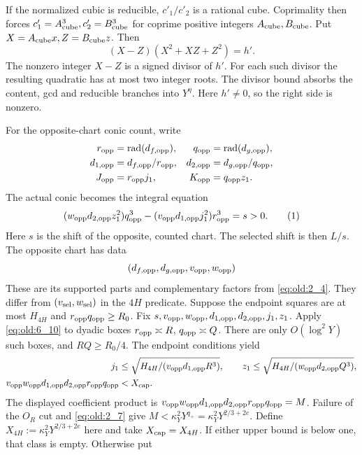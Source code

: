 If the normalized cubic is reducible, \(c'_1/c'_2\) is a rational cube.
Coprimality then forces \(c'_1=A_{\rm cube}^3,c'_2=B_{\rm cube}^3\) for
coprime positive integers \(A_{\rm cube},B_{\rm cube}\).  Put
\(X=A_{\rm cube}x,Z=B_{\rm cube}z\).  Then
\[
 (X-Z)(X^2+XZ+Z^2)=h'.
\]
The nonzero integer $X-Z$ is a signed divisor of $h'$.  For each such
divisor the resulting quadratic has at most two integer roots.  The
divisor bound absorbs the content, gcd and reducible branches into
$Y^\eta$.  Here \(h'\ne0\), so the right side is nonzero.

For the opposite-chart conic count, write
\[
\begin{aligned}
 r_{\rm opp}&=\operatorname{rad}(d_{f,\rm opp}),&
 q_{\rm opp}&=\operatorname{rad}(d_{g,\rm opp}),\\
 d_{1,\rm opp}&=d_{f,\rm opp}/r_{\rm opp},&
 d_{2,\rm opp}&=d_{g,\rm opp}/q_{\rm opp},\\
 J_{\rm opp}&=r_{\rm opp}j_1,&K_{\rm opp}&=q_{\rm opp}z_1.
\end{aligned}
\]
The actual conic becomes the integral equation
\[
 (w_{\rm opp}d_{2,\rm opp}z_1^2)q_{\rm opp}^3
 -(v_{\rm opp}d_{1,\rm opp}j_1^2)r_{\rm opp}^3=s>0.
\AutoTag{eq:old:6_11}
\]
Here \(s\) is the shift of the opposite, counted chart. The selected
shift is then \(L/s\). The opposite chart has data
\[
(d_{f,\rm opp},d_{g,\rm opp},v_{\rm opp},w_{\rm opp})
\]
These are its supported parts and complementary factors from
\eqref{eq:old:2_4}. They differ from \((v_{\rm sel},w_{\rm sel})\) in
the \(4H\) predicate. Suppose the endpoint squares are at most
\(H_{4H}\) and \(r_{\rm opp}q_{\rm opp}\ge R_0\).  Fix
\(s,v_{\rm opp},w_{\rm opp},d_{1,\rm opp},d_{2,\rm opp},j_1,z_1\).
Apply \eqref{eq:old:6_10} to dyadic boxes
\(r_{\rm opp}\asymp R\), \(q_{\rm opp}\asymp Q\).  There are only
\(O(\log^2Y)\) such boxes, and \(RQ\ge R_0/4\).  The endpoint conditions
yield
\[
\begin{aligned}
 j_1&\le\sqrt{H_{4H}/(v_{\rm opp}d_{1,\rm opp}R^3)},\qquad
 z_1\le\sqrt{H_{4H}/(w_{\rm opp}d_{2,\rm opp}Q^3)},\\
 v_{\rm opp}w_{\rm opp}d_{1,\rm opp}d_{2,\rm opp}
 r_{\rm opp}q_{\rm opp}&<X_{\rm cap}.
\end{aligned}
\]
The displayed coefficient product is
\(v_{\rm opp}w_{\rm opp}d_{1,\rm opp}d_{2,\rm opp}r_{\rm opp}q_{\rm opp}=M\).
Failure of the \(O_R\) cut and \eqref{eq:old:2_7} give
\(M<\kappa_Y^2Y^{q_+}=\kappa_Y^2Y^{2/3+2e}\).  Define
\(X_{4H}:=\kappa_Y^2Y^{2/3+2e}\) here and take \(X_{\rm cap}=X_{4H}\).
If either upper bound is below one, that class is empty.  Otherwise put
